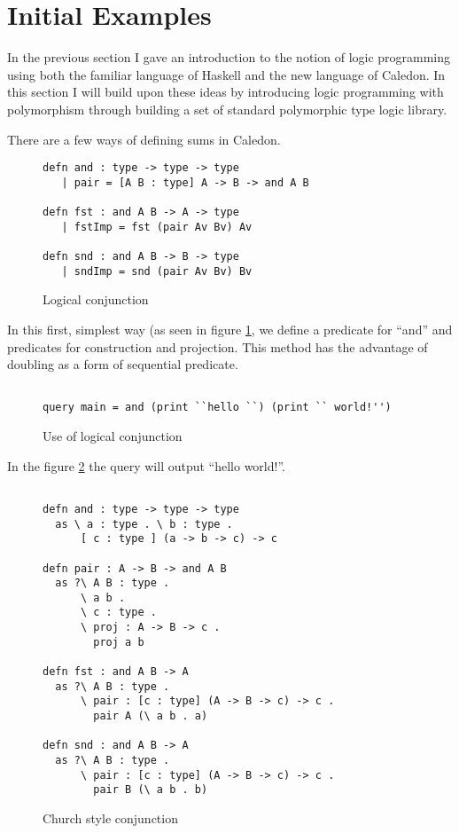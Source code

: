\section{Initial Examples}


In the previous section I gave an introduction to the notion of logic programming using
both the familiar language of Haskell and the new language of Caledon. In this section
I will build upon these ideas by introducing logic programming with polymorphism
through building a set of standard polymorphic type logic library.

There are a few ways of defining sums in Caledon.


\begin{figure}[H]
\begin{lstlisting}
defn and : type -> type -> type
   | pair = [A B : type] A -> B -> and A B

defn fst : and A B -> A -> type
   | fstImp = fst (pair Av Bv) Av

defn snd : and A B -> B -> type
   | sndImp = snd (pair Av Bv) Bv
\end{lstlisting}
\caption{Logical conjunction}
\label{code:lconj}
\end{figure}

In this first, simplest way (as seen in figure \ref{code:lconj}, we define a predicate for “and” and
predicates for construction and projection. This method has the advantage of doubling
as a form of sequential predicate.

\begin{figure}[H]
\begin{lstlisting}

query main = and (print ``hello ``) (print `` world!'')
\end{lstlisting}
\caption{Use of logical conjunction}
\label{code:lconjuse}
\end{figure}

In the figure \ref{code:lconjuse} the query will output ``hello world!''.

\begin{figure}[H]
\begin{lstlisting}

defn and : type -> type -> type
  as \ a : type . \ b : type . 
      [ c : type ] (a -> b -> c) -> c

defn pair : A -> B -> and A B
  as ?\ A B : type .
      \ a b .
      \ c : type .
      \ proj : A -> B -> c .
        proj a b

defn fst : and A B -> A
  as ?\ A B : type .
      \ pair : [c : type] (A -> B -> c) -> c .
        pair A (\ a b . a)

defn snd : and A B -> A
  as ?\ A B : type .
      \ pair : [c : type] (A -> B -> c) -> c .
        pair B (\ a b . b)

\end{lstlisting}
\caption{Church style conjunction}
\label{code:cconj}
\end{figure}

